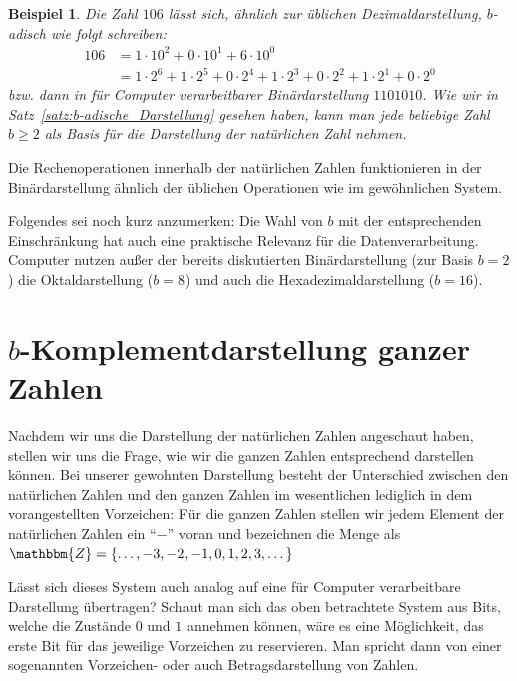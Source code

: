 \documentclass{article}
\newcommand{\Z}{\mathbbm{Z}} %
\newtheorem{beispiel}[satz]{Beispiel}
\begin{document}
  \begin{beispiel} \label{bsp:Binärdarstellung}
    Die Zahl $106$ lässt sich, ähnlich zur üblichen Dezimaldarstellung, $b$-adisch wie folgt schreiben:
    \begin{align*}
      106 &= 1 \cdot 10^2 + 0 \cdot 10^1 + 6 \cdot 10^0 \\
          &= 1 \cdot 2^6 + 1 \cdot 2^5 + 0 \cdot 2^4 + 1 \cdot 2^3 + 0 \cdot 2^2 + 1 \cdot 2^1 + 0 \cdot 2^0
    \end{align*}
    bzw. dann in für Computer verarbeitbarer Binärdarstellung $1101010$. 
    Wie wir in Satz~\ref{satz:b-adische_Darstellung} gesehen haben, kann man jede beliebige Zahl $b\geq 2$ als Basis für die Darstellung der natürlichen Zahl nehmen.
  \end{beispiel}

  \vspace{\baselineskip}

  Die Rechenoperationen innerhalb der natürlichen Zahlen funktionieren in der Binärdarstellung ähnlich der üblichen Operationen wie im gewöhnlichen System.

  \vspace{\baselineskip}

  Folgendes sei noch kurz anzumerken:
  Die Wahl von $b$ mit der entsprechenden Einschränkung hat auch eine praktische Relevanz für die Datenverarbeitung.
  Computer nutzen außer der bereits diskutierten Binärdarstellung (zur Basis $b=2$) die Oktaldarstellung ($b=8$) und auch die Hexadezimaldarstellung ($b=16$).

\newpage


\section{$b$-Komplementdarstellung ganzer Zahlen}

  Nachdem wir uns die Darstellung der natürlichen Zahlen angeschaut haben, stellen wir uns die Frage, wie wir die ganzen Zahlen entsprechend darstellen können.
  Bei unserer gewohnten Darstellung besteht der Unterschied zwischen den natürlichen Zahlen und den ganzen Zahlen im wesentlichen lediglich in dem vorangestellten Vorzeichen:
  Für die ganzen Zahlen stellen wir jedem Element der natürlichen Zahlen ein ``$-$'' voran und bezeichnen die Menge als $\Z = \{\dots,-3, -2, -1, 0, 1,2,3,\dots\}$

  Lässt sich dieses System auch analog auf eine für Computer verarbeitbare Darstellung übertragen?
  Schaut man sich das oben betrachtete System aus Bits, welche die Zustände $0$ und $1$ annehmen können, wäre es eine Möglichkeit, das erste Bit für das jeweilige Vorzeichen zu reservieren.
  Man spricht dann von einer sogenannten Vorzeichen- oder auch Betragsdarstellung von Zahlen.
\end{document}
